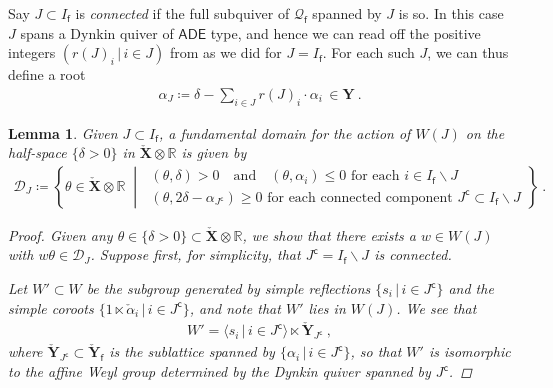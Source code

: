 \documentclass[reqno,a4paper]{amsart}
\newcommand{\calD}{\mathcal{D}}
\newcommand{\R}{\mathbb{R}}
\newcommand{\sff}{\mathsf{f}}
\newcommand{\bfY}{\mathbf{Y}}
\newcommand{\bfX}{\mathbf{X}}
\newcommand{\qvfin}{\mathcal{Q}_\sff}
\newcommand{\rootlattice}{\bfY}
\newcommand{\corootlattice}{\check{\bfY}}
\newcommand{\corootlatticefin}{\check{\rootlattice}_\sff}
\newcommand{\weightlattice}{\bfX}
\newcommand{\coweightlattice}{\check{\weightlattice}}
\newcommand{\Jcomp}{{J^\mathsf{c}}}
\theoremstyle{basic-theorem}
\newtheorem{lemma}[theorem]{Lemma}
\numberwithin{equation}{section}
\begin{document}
Say $J\subset I_\sff$ is \textit{connected} if the full subquiver of $\qvfin$ spanned by $J$ is so. In this case $J$ spans a Dynkin quiver of $\mathsf{ADE}$ type, and hence we can read off the positive integers $(r(J)_i\,\vert\, i\in J)$ from \cite[Table~Z]{kacInfiniteRootSystems} as we did for $J=I_\sff$. For each such $J$, we can thus define a root
\begin{align}
	\alpha_{J}\coloneqq\delta - \sum_{i\in J} r(J)_i \cdot \alpha_i \, \in \rootlattice\ .
\end{align}

\begin{lemma}
    \label{lem:fundamentaldomain-WJ}
    Given $J\subset I_\sff$, a fundamental domain for the action of $W(J)$ on the half-space
    $\{\delta>0\}$ in $\coweightlattice\otimes\R$ is given by
    \begin{align}
        \calD_J\coloneqq\left\{ \theta\in \coweightlattice\otimes
        \R\;\middle\vert\;
        \begin{array}{l}
            (\theta,\delta) > 0\quad\text{and}\quad
            (\theta, \alpha_i) \leq 0\text{ for each }i\in I_\sff\smallsetminus J\\
            (\theta, 2\delta-\alpha_{\Jcomp})\geq 0
            \text{ for each connected component }\Jcomp\subset I_\sff\smallsetminus J
        \end{array}\right\}\ .
    \end{align}

    \begin{proof}
        Given any $\theta\in\{\delta>0\}\subset \coweightlattice\otimes \R$, we
        show that there exists a $w\in W(J)$ with $w\theta\in \calD_J$. Suppose
        first, for simplicity, that $\Jcomp=I_\sff\smallsetminus J$ is connected.

        Let $W'\subset W$ be the subgroup generated by simple reflections
        $\{s_{i}\,\vert\,i\in \Jcomp\}$ and the simple coroots
        $\{1\ltimes \check\alpha_{i}\,\vert\, i\in \Jcomp\}$, and note that $W'$ lies in $W(J)$. We see that
		\begin{align}
			W' = \langle s_i\,\vert\,i\in \Jcomp \rangle \ltimes
            \corootlattice_{\Jcomp} \ ,
		\end{align}
        where $\corootlattice_{\Jcomp}\subset \corootlatticefin$ is the
        sublattice spanned by $\{\alpha_{i}\,\vert\, i\in \Jcomp\}$, so
        that $W'$ is isomorphic to the affine Weyl group determined by the
        Dynkin quiver spanned by $\Jcomp$.


\end{proof}
\end{lemma}
\end{document}
